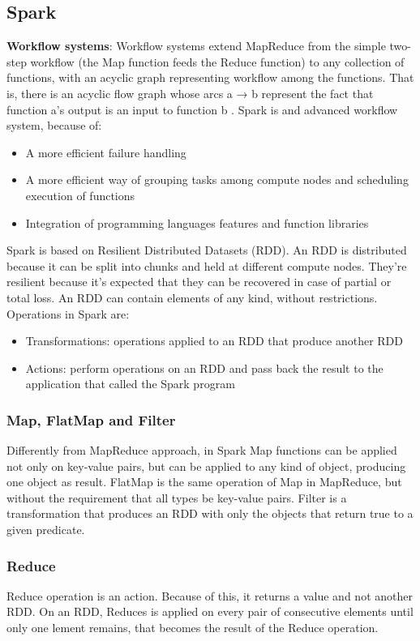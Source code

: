 \documentclass[\main/main.tex]{subfiles}
\begin{document}
\subsection{Spark}
\textbf{Workflow systems}: Workflow systems extend MapReduce from the simple two-step workflow (the Map function feeds the Reduce function) to any collection of functions, with an acyclic graph representing workflow among the functions. That is, there is an acyclic flow graph whose arcs a → b represent the fact that function a’s output is an input to function b \cite{leskovec_rajaraman_ullman_2020}.
Spark is and advanced workflow system, because of:
\begin{itemize}
    \item A more efficient failure handling
    \item A more efficient way of grouping tasks among compute nodes and scheduling execution of functions
    \item Integration of programming languages features and function libraries
\end{itemize}
Spark is based on Resilient Distributed Datasets (RDD). An RDD is distributed because it can be split into chunks and held at different compute nodes. They're resilient because it's expected that they can be recovered in case of partial or total loss. An RDD can contain elements of any kind, without restrictions.
Operations in Spark are:
\begin{itemize}
    \item Transformations: operations applied to an RDD that produce another RDD
    \item Actions: perform operations on an RDD and pass back the result to the application that called the Spark program
\end{itemize}
\subsubsection{Map, FlatMap and Filter}
Differently from MapReduce approach, in Spark Map functions can be applied not only on key-value pairs, but can be applied to any kind of object, producing one object as result. 
FlatMap is the same operation of Map in MapReduce, but without the requirement that all types be key-value pairs. Filter is a transformation that produces an RDD with only the objects that return true to a given predicate.
\subsubsection{Reduce}
Reduce operation is an action. Because of this, it returns a value and not another RDD. On an RDD, Reduces is applied on every pair of consecutive elements until only one lement remains, that becomes the result of the Reduce operation.
\end{document}
